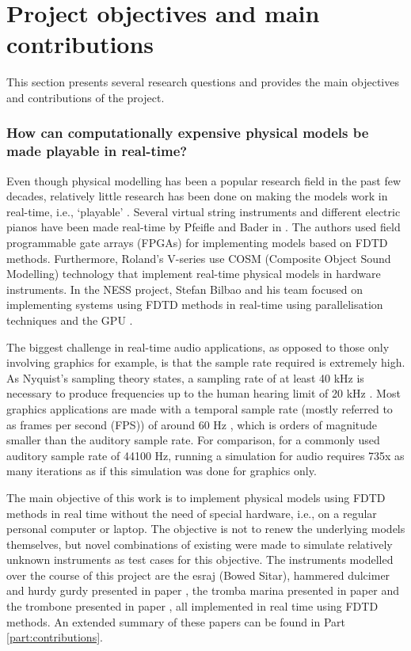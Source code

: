 \section{Project objectives and main contributions}
This section presents several research questions and provides the main objectives and contributions of the project. 

\subsubsection{How can computationally expensive physical models be made playable in real-time?}

Even though physical modelling has been a popular research field in the past few decades, relatively little research has been done on making the models work in real-time, i.e., `playable’ \cite{Mehes2016}. Several virtual string instruments and different electric pianos have been made real-time by Pfeifle and Bader in \cite{Pfeifle2012, Pfeifle2015, Pfeifle2017}. The authors used field programmable gate arrays (FPGAs) for implementing models based on FDTD methods. Furthermore, Roland’s V-series use COSM (Composite Object Sound Modelling) technology \cite{Bybee2019} that implement real-time physical models in hardware instruments. In the NESS project, Stefan Bilbao and his team focused on implementing systems using FDTD methods in real-time using parallelisation techniques and the GPU \cite{Bilbao2019CMJa,Bilbao2019CMJb}. 


The biggest challenge in real-time audio applications, as opposed to those only involving graphics for example, is that the sample rate required is extremely high. As Nyquist's sampling theory states, a sampling rate of at least 40 kHz is necessary to produce frequencies up to the human hearing limit of 20 kHz \cite{Nyquist}. Most graphics applications are made with a temporal sample rate (mostly referred to as frames per second (FPS)) of around 60 Hz \cite{Yantis2016}, which is orders of magnitude smaller than the auditory sample rate. For comparison, for a commonly used auditory sample rate of 44100 Hz, running a simulation for audio requires 735x as many iterations as if this simulation was done for graphics only.  

The main objective of this work is to implement physical models using FDTD methods in real time without the need of special hardware, i.e., on a regular personal computer or laptop. The objective is not to renew the underlying models themselves, but novel combinations of existing were made to simulate relatively unknown instruments as test cases for this objective. The instruments modelled over the course of this project are the esraj (Bowed Sitar), hammered dulcimer and hurdy gurdy presented in paper \citeP[A], the tromba marina presented in paper \citeP[D] and the trombone presented in paper \citeP[H], all implemented in real time using FDTD methods. An extended summary of these papers can be found in Part \ref{part:contributions}.

